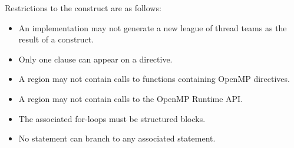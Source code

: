 {{{{\restrictions
Restrictions to the  construct are as follows:

\begin{itemize}
  \item An implementation may not generate a new league of thread teams
    as the result of a  construct.

  \item Only one  clause can appear on a  directive.
  

  \item A  region may not contain calls to functions containing
    OpenMP directives. %
    

  \item A  region may not contain calls to the OpenMP Runtime
    API.

\end{itemize}

\begin{ccppspecific}
\begin{itemize}
    
  \item The associated for-loops must be structured blocks.

  \item No statement can branch to any associated  statement.

\end{itemize}

\end{ccppspecific}

\begin{fortranspecific}
\begin{itemize}
    

\end{itemize}
\end{fortranspecific}}}}}
